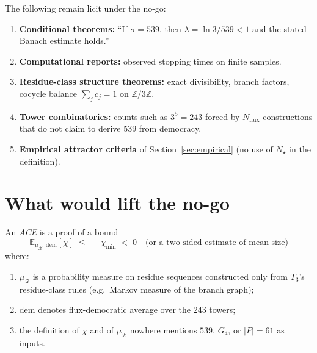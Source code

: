 \begin{corollary}
\label{cor:licit}
The following remain licit under the no-go:
\begin{enumerate}[label=(\roman*)]
  \item \textbf{Conditional theorems:} ``If \(\sigma=539\), then \(\lambda=\ln 3/539<1\)
        and the stated Banach estimate holds.''
  \item \textbf{Computational reports:} observed stopping times on finite samples.
  \item \textbf{Residue-class structure theorems:} exact divisibility, branch
        factors, cocycle balance \(\sum_j c_j=1\) on \(\mathbb{Z}/3\mathbb{Z}\).
  \item \textbf{Tower combinatorics:} counts such as \(3^5=243\) forced by
        \(N_{\mathrm{flux}}\) constructions that do not claim to derive \(539\)
        from democracy.
  \item \textbf{Empirical attractor criteria} of Section~\ref{sec:empirical}
        (no use of \(N_\star\) in the definition).
\end{enumerate}
\end{corollary}

\section{What would lift the no-go}
\label{sec:lift}

\begin{definition}
\label{def:ACE}
An \emph{ACE} is a proof of a bound
\[
\mathbb{E}_{\mu_{\mathcal{R}},\,\mathrm{dem}}[\chi]
\;\le\;
-\chi_{\min}
\;<\;0
\quad\text{(or a two-sided estimate of mean size)}
\]
where:
\begin{enumerate}[label=(\roman*)]
  \item \(\mu_{\mathcal{R}}\) is a probability measure on residue sequences
        constructed only from \(T_3\)'s residue-class rules (e.g.\ Markov
        measure of the branch graph);
  \item \(\mathrm{dem}\) denotes flux-democratic average over the \(243\) towers;
  \item the definition of \(\chi\) and of \(\mu_{\mathcal{R}}\) nowhere
        mentions \(539\), \(G_4\), or \(|P|=61\) as inputs.
\end{enumerate}
\end{definition}

